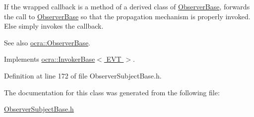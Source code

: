 If the wrapped callback is a method of a derived class of \hyperlink{classocra_1_1ObserverBase}{Observer\+Base}, forwards the call to \hyperlink{classocra_1_1ObserverBase}{Observer\+Base} so that the propagation mechanism is properly invoked. Else simply invokes the callback. \begin{DoxySeeAlso}{See also}
\hyperlink{classocra_1_1ObserverBase}{ocra\+::\+Observer\+Base}. 
\end{DoxySeeAlso}


Implements \hyperlink{classocra_1_1InvokerBase_ae4d7537a1b2c0aa9b5188c5da8423289}{ocra\+::\+Invoker\+Base$<$ E\+V\+T $>$}.



Definition at line 172 of file Observer\+Subject\+Base.\+h.



The documentation for this class was generated from the following file\+:\begin{DoxyCompactItemize}
\item 
\hyperlink{ObserverSubjectBase_8h}{Observer\+Subject\+Base.\+h}\end{DoxyCompactItemize}
